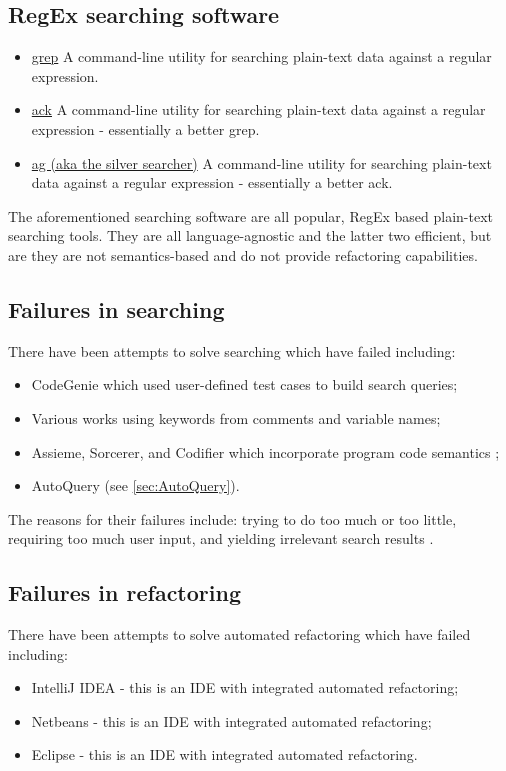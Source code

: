 \documentclass[12pt, letterpaper]{article}
\begin{document}
\subsection{RegEx searching software}
\begin{itemize}
  \item \href{https://en.wikipedia.org/wiki/Grep}{grep}\newline
  A command-line utility for searching plain-text data against a regular expression.
  \item \href{https://beyondgrep.com/}{ack}\newline
  A command-line utility for searching plain-text data against a regular expression - essentially a better grep.
  \item \href{https://github.com/ggreer/the_silver_searcher}{ag (aka the silver searcher)}\newline
  A command-line utility for searching plain-text data against a regular expression - essentially a better ack.
\end{itemize}

The aforementioned searching software are all popular, RegEx based plain-text searching tools.
They are all language-agnostic and the latter two efficient, but are they are not semantics-based and do not provide refactoring capabilities.

\subsection{Failures in searching}
There have been attempts to solve searching which have failed including:
\begin{itemize}
  \item CodeGenie which used user-defined test cases to build search queries;
  \item Various works using keywords from comments and variable names;
  \item Assieme, Sorcerer, and Codifier which incorporate program code semantics \autocite{reiss2009semantics};
  \item AutoQuery (see \ref{sec:AutoQuery}).
\end{itemize}

The reasons for their failures include: trying to do too much or too little, requiring too much user input, and yielding irrelevant search results \autocite{reiss2009semantics,stolee2014solving}.

\subsection{Failures in refactoring}
There have been attempts to solve automated refactoring which have failed including:
\begin{itemize}
  \item IntelliJ IDEA - this is an IDE with integrated automated refactoring;
  \item Netbeans - this is an IDE with integrated automated refactoring;
  \item Eclipse - this is an IDE with integrated automated refactoring.
\end{itemize}
\end{document}
